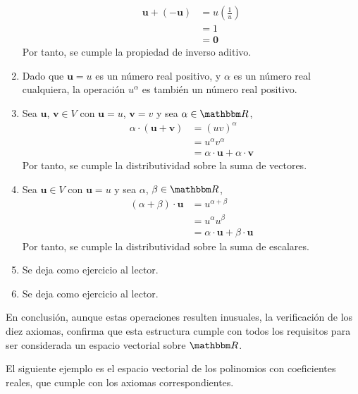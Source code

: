 \begin{examplebox}{}{}
\begin{enumerate}[label=\roman*), topsep=6pt, itemsep=0pt]
\begin{align*}
            \mathbf{u} + (-\mathbf{u}) & = u \left( \frac{1}{u} \right) \\
            & = 1 \\
            & = \mathbf{0}
        \end{align*}
        Por tanto, se cumple la propiedad de inverso aditivo.
        \item Dado que $\mathbf{u} = u$ es un número real positivo, y $\alpha$ es un número real cualquiera, la operación $u^{\alpha}$ es también un número real positivo.
        \item Sea $\mathbf{u}$, $\mathbf{v} \in V$ con $\mathbf{u} = u$, $\mathbf{v} = v$ y sea $\alpha \in \RR$,
        \begin{align*}
            \alpha \cdot (\mathbf{u} + \mathbf{v}) & = (uv)^{\alpha} \\
            & = u^{\alpha} v^{\alpha} \\
            & = \alpha \cdot \mathbf{u} + \alpha \cdot \mathbf{v}
        \end{align*}
        Por tanto, se cumple la distributividad sobre la suma de vectores.
        \item Sea $\mathbf{u} \in V$ con $\mathbf{u} = u$ y sea $\alpha$, $\beta \in \RR$,
        \begin{align*}
            (\alpha + \beta) \cdot \mathbf{u} & = u^{\alpha + \beta} \\
            & = u^{\alpha} u^{\beta} \\
            & = \alpha \cdot \mathbf{u} + \beta \cdot \mathbf{u}
        \end{align*}
        Por tanto, se cumple la distributividad sobre la suma de escalares.
        \item Se deja como ejercicio al lector.
        \item Se deja como ejercicio al lector.
    \end{enumerate}
    En conclusión, aunque estas operaciones resulten inusuales, la verificación de los diez axiomas, confirma que esta estructura cumple con todos los requisitos para ser considerada un espacio vectorial sobre $\RR$.
\end{examplebox}

El siguiente ejemplo es el espacio vectorial de los polinomios con coeficientes reales, que cumple con los axiomas correspondientes.


